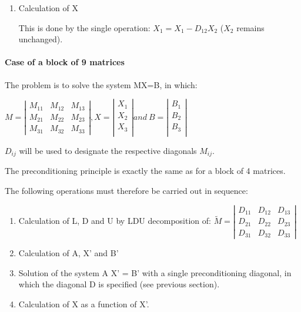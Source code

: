 \begin{enumerate}
On completion of these operations, the matrix A takes the place of M.

X' is also calculated in situ by the operation: $X_{1} = X_{1} + D_{12} X_{2}$
($X_{2}$ remains unchanged).

B' is calculated by the operation: $B_{2} = B_{2} - D_{21} B_{1}$  ($B_{1}$
remains unchanged).

\setcounter{enumi}{3}
\item Calculation of X

This is done by the single operation: $X_{1} = X_{1} - D_{12} X_{2}$  ($X_{2}$
remains unchanged).
\end{enumerate}

\paragraph{Case of a block of 9 matrices}

The problem is to solve the system MX=B, in which:

$M =
\left|
\begin{array}{ccc}
  M_{11} & M_{12} & M_{13} \\
  M_{21} & M_{22} & M_{23} \\
  M_{31} & M_{32} & M_{33}
\end{array}
\right|,
X =
\left|
\begin{array}{ccc}
  X_{1}  \\
  X_{2}  \\
  X_{3}  \\
\end{array}
\right|
and~B =
\left|
\begin{array}{ccc}
  B_{1}  \\
  B_{2}  \\
  B_{3}  \\
\end{array}
\right|
$

$D_{ij}$  will be used to designate the respective diagonals $M_{ij}$.

The preconditioning principle is exactly the same as for a block of 4 matrices.

The following operations must therefore be carried out in sequence:

\begin{enumerate}
  \item  Calculation of L, D and U by LDU decomposition of:
    $\tilde{M}=\left|
     \begin{array}{ccc}
       {D_{11} } & {D_{12} } & {D_{13} } \\
       {D_{21} } & {D_{22} } & {D_{23} } \\
       {D_{31} } & {D_{32} } & {D_{33} }
    \end{array}\right|$
  \item Calculation of A, X' and B'
  \item Solution of the system A X' = B' with a single preconditioning
    diagonal, in which the diagonal D is specified (see previous section).
  \item Calculation of X as a function of X'.

\end{enumerate}

